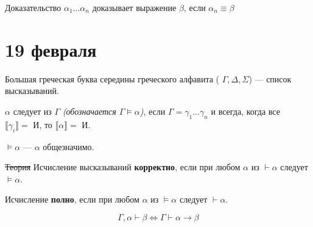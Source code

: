 \documentclass[12pt, a4paper, oneside]{book}
\begin{document}
\begin{definition}
    Доказательство \(\alpha_1\dots \alpha_n\) доказывает выражение \(\beta\), если \(\alpha_n \equiv \beta\)
\end{definition}

\chapter{19 февраля}

\begin{obozn}
    Большая греческая буква середины греческого алфавита ( \(\Gamma, \Delta, \Sigma\)) --- список высказываний.
\end{obozn}

\begin{definition}[следование]
    \(\alpha\) следует из \(\Gamma\) \textit{(обозначается \(\Gamma\models\alpha\))}, если \(\Gamma = \gamma_1 \dots \gamma_n\) и всегда, когда все \(\llbracket \gamma_i \rrbracket = \text{ И}\), то \(\llbracket \alpha \rrbracket = \text{ И}\).
\end{definition}

\begin{example}
    \(\models \alpha\) --- \(\alpha\) общезначимо.
\end{example}

\begin{definition}
    \sout{Теория} Исчисление высказываний \textbf{корректно}, если при любом \(\alpha\) из \(\vdash \alpha\) следует \(\models \alpha\).
\end{definition}

\begin{definition}
    Исчисление \textbf{полно}, если при любом \(\alpha\) из \(\models \alpha\) следует \(\vdash \alpha\).
\end{definition}

\begin{theorem}[о дедукции]
    \[\Gamma, \alpha \vdash \beta \Leftrightarrow \Gamma \vdash \alpha \to \beta\]
\end{theorem}
\end{document}
